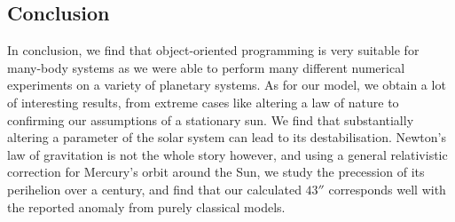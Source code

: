 \subsection{Conclusion}
In conclusion, we find that object-oriented programming is very suitable for many-body systems as we were able to perform many different numerical experiments on a variety of planetary systems. As for our model, we obtain a lot of interesting results, from extreme cases like altering a law of nature to confirming our assumptions of a stationary sun. We find that substantially altering a parameter of the solar system can lead to its destabilisation. Newton's law of gravitation is not the whole story however, and using a general relativistic correction for Mercury's orbit around the Sun, we study the precession of its perihelion over a century, and find that our calculated $43''$ corresponds well with the reported anomaly from purely classical models.

